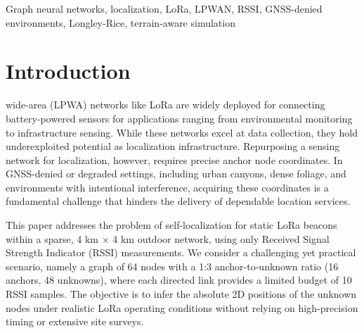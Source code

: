 \documentclass{ieeeaccess}
\begin{document}
\begin{keywords}
Graph neural networks, localization, LoRa, LPWAN, RSSI, GNSS-denied environments, Longley-Rice, terrain-aware simulation
\end{keywords}

\titlepgskip=-21pt

\maketitle

\section{Introduction}
\label{sec:introduction}
 wide-area (LPWA) networks like LoRa are widely deployed for connecting battery-powered sensors for applications ranging from environmental monitoring to infrastructure sensing. While these networks excel at data collection, they hold underexploited potential as localization infrastructure. Repurposing a sensing network for localization, however, requires precise anchor node coordinates. In GNSS-denied or degraded settings, including urban canyons, dense foliage, and environments with intentional interference, acquiring these coordinates is a fundamental challenge that hinders the delivery of dependable location services.

This paper addresses the problem of self-localization for static LoRa beacons within a sparse, 4 km $\times$ 4 km outdoor network, using only Received Signal Strength Indicator (RSSI) measurements. We consider a challenging yet practical scenario, namely a graph of 64 nodes with a 1:3 anchor-to-unknown ratio (16 anchors, 48 unknowns), where each directed link provides a limited budget of 10 RSSI samples. The objective is to infer the absolute 2D positions of the unknown nodes under realistic LoRa operating conditions without relying on high-precision timing or extensive site surveys.
\end{document}
